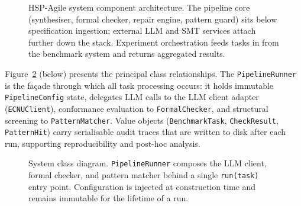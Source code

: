 \begin{figure}[t]
  \centering
  \caption{HSP-Agile system component architecture.  The pipeline core
           (synthesiser, formal checker, repair engine, pattern guard) sits
           below specification ingestion; external LLM and SMT services attach
           further down the stack.  Experiment orchestration feeds tasks in
           from the benchmark system and returns aggregated results.}
  \label{fig:component-arch}
\end{figure}

Figure~\ref{fig:system-class} (below) presents the principal class relationships.
The \texttt{PipelineRunner} is the façade through which all task processing
occurs: it holds immutable \texttt{PipelineConfig} state, delegates LLM calls
to the LLM client adapter (\texttt{ECNUClient}), conformance evaluation to \texttt{FormalChecker},
and structural screening to \texttt{PatternMatcher}.  Value objects
(\texttt{BenchmarkTask}, \texttt{CheckResult}, \texttt{PatternHit}) carry
serialisable audit traces that are written to disk after each run, supporting
reproducibility and post-hoc analysis.

\begin{figure}[t]
  \centering
  \caption{System class diagram.  \texttt{PipelineRunner} composes the LLM
           client, formal checker, and pattern matcher behind a single
           \texttt{run(task)} entry point.  Configuration is injected at
           construction time and remains immutable for the lifetime of a run.}
  \label{fig:system-class}
\end{figure}

